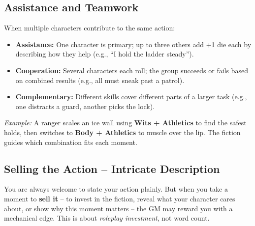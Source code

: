 \subsection{Assistance and Teamwork}
\label{sec:assistance-teamwork}
When multiple characters contribute to the same action:
\begin{itemize}
  \item \textbf{Assistance:} One character is primary; up to three others add
        +1 die each by describing how they help (e.g., ``I hold the ladder steady'').
  \item \textbf{Cooperation:} Several characters each roll; the group succeeds
        or fails based on combined results (e.g., all must sneak past a patrol).
  \item \textbf{Complementary:} Different skills cover different parts of a
        larger task (e.g., one distracts a guard, another picks the lock).
\end{itemize}

\emph{Example:} A ranger scales an ice wall using \textbf{Wits + Athletics}
to find the safest holds, then switches to \textbf{Body + Athletics} to muscle over the
lip. The fiction guides which combination fits each moment.

\subsection{Selling the Action -- Intricate Description}
\label{sec:intricate-description}

You are always welcome to state your action plainly. But when you take a moment
to \textbf{sell it} -- to invest in the fiction, reveal what your character cares
about, or show why this moment matters -- the GM may reward you with a mechanical
edge. This is about \emph{roleplay investment}, not word count.

